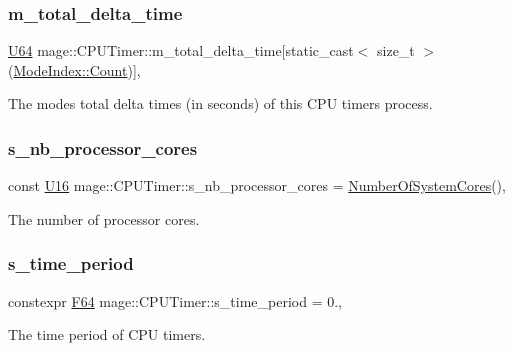 \subsubsection{\texorpdfstring{m\+\_\+total\+\_\+delta\+\_\+time}{m\_total\_delta\_time}}
{\footnotesize\ttfamily \hyperlink{namespacemage_a6672cf3c861707ce4a3235a3eb43941d}{U64} mage\+::\+C\+P\+U\+Timer\+::m\+\_\+total\+\_\+delta\+\_\+time\mbox{[}static\+\_\+cast$<$ size\+\_\+t $>$(\hyperlink{classmage_1_1_c_p_u_timer_a220f69be8f304f6fad61ccb358d278faae93f994f01c537c4e2f7d8528c3eb5e9}{Mode\+Index\+::\+Count})\mbox{]}\hspace{0.3cm}{\ttfamily [mutable]}, {\ttfamily [private]}}

The modes\textquotesingle{} total delta times (in seconds) of this C\+PU timer\textquotesingle{}s process. \hypertarget{classmage_1_1_c_p_u_timer_a49e518f172efcc1e43baef65bb5ab3a7}{}\label{classmage_1_1_c_p_u_timer_a49e518f172efcc1e43baef65bb5ab3a7} 
\subsubsection{\texorpdfstring{s\+\_\+nb\+\_\+processor\+\_\+cores}{s\_nb\_processor\_cores}}
{\footnotesize\ttfamily const \hyperlink{namespacemage_af69057eec1ce005c1c3b34ae33486f16}{U16} mage\+::\+C\+P\+U\+Timer\+::s\+\_\+nb\+\_\+processor\+\_\+cores = \hyperlink{namespacemage_a825ee5d6ce6db3c24967af86ed40edd4}{Number\+Of\+System\+Cores}()\hspace{0.3cm}{\ttfamily [static]}, {\ttfamily [private]}}

The number of processor cores. \hypertarget{classmage_1_1_c_p_u_timer_af7371eff8de8b5f667769ec71a69e9cf}{}\label{classmage_1_1_c_p_u_timer_af7371eff8de8b5f667769ec71a69e9cf} 
\subsubsection{\texorpdfstring{s\+\_\+time\+\_\+period}{s\_time\_period}}
{\footnotesize\ttfamily constexpr \hyperlink{namespacemage_ad26233bbec640deda836e572c1a23708}{F64} mage\+::\+C\+P\+U\+Timer\+::s\+\_\+time\+\_\+period = 0.\hspace{0.3cm}{\ttfamily [static]}, {\ttfamily [private]}}

The time period of C\+PU timers. 